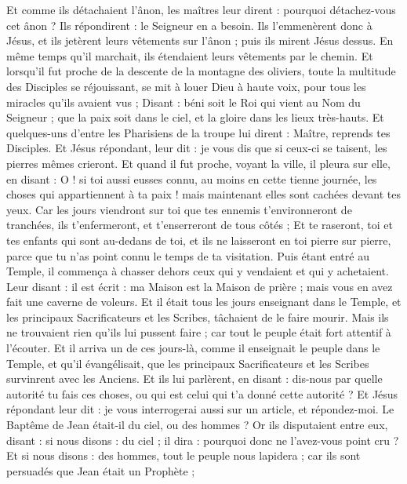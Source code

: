 \begin{multicols}{2}
Et comme ils détachaient l'ânon, les maîtres leur dirent : pourquoi détachez-vous cet ânon ?
Ils répondirent : le Seigneur en a besoin.
Ils l'emmenèrent donc à Jésus, et ils jetèrent leurs vêtements sur l'ânon ; puis ils mirent Jésus dessus.
En même temps qu'il marchait, ils étendaient leurs vêtements par le chemin.
Et lorsqu'il fut proche de la descente de la montagne des oliviers, toute la multitude des Disciples se réjouissant, se mit à louer Dieu à haute voix, pour tous les miracles qu'ils avaient vus ;
Disant : béni soit le Roi qui vient au Nom du Seigneur ; que la paix soit dans le ciel, et la gloire dans les lieux très-hauts.
Et quelques-uns d'entre les Pharisiens de la troupe lui dirent : Maître, reprends tes Disciples.
Et Jésus répondant, leur dit : je vous dis que si ceux-ci se taisent, les pierres mêmes crieront.
Et quand il fut proche, voyant la ville, il pleura sur elle, en disant :
O ! si toi aussi eusses connu, au moins en cette tienne journée, les choses qui appartiennent à ta paix ! mais maintenant elles sont cachées devant tes yeux.
Car les jours viendront sur toi que tes ennemis t'environneront de tranchées, ils t'enfermeront, et t'enserreront de tous côtés ;
Et te raseront, toi et tes enfants qui sont au-dedans de toi, et ils ne laisseront en toi pierre sur pierre, parce que tu n'as point connu le temps de ta visitation.
Puis étant entré au Temple, il commença à chasser dehors ceux qui y vendaient et qui y achetaient.
Leur disant : il est écrit : ma Maison est la Maison de prière ; mais vous en avez fait une caverne de voleurs.
Et il était tous les jours enseignant dans le Temple, et les principaux Sacrificateurs et les Scribes, tâchaient de le faire mourir.
Mais ils ne trouvaient rien qu'ils lui pussent faire ; car tout le peuple était fort attentif à l'écouter.
\VerseOne{}Et il arriva un de ces jours-là, comme il enseignait le peuple dans le Temple, et qu'il évangélisait, que les principaux Sacrificateurs et les Scribes survinrent avec les Anciens.
Et ils lui parlèrent, en disant : dis-nous par quelle autorité tu fais ces choses, ou qui est celui qui t'a donné cette autorité ?
Et Jésus répondant leur dit : je vous interrogerai aussi sur un article, et répondez-moi.
Le Baptême de Jean était-il du ciel, ou des hommes ?
Or ils disputaient entre eux, disant : si nous disons : du ciel ; il dira : pourquoi donc ne l'avez-vous point cru ?
Et si nous disons : des hommes, tout le peuple nous lapidera ; car ils sont persuadés que Jean était un Prophète ;

\end{multicols}
